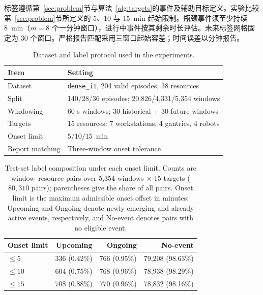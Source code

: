 \documentclass[a4paper,fleqn]{cas-dc}
\newcommand{\zhpara}[1]{%
  \par\begingroup\small\color{black!72}\noindent #1\par\endgroup}
\begin{document}
\zhpara{标签遵循第~\ref{sec:problem}节与算法~\ref{alg:targets}的事件及辅助目标定义。实验比较第~\ref{sec:problem}节所定义的 5、10 与 15~min 起始限制。瓶颈事件须至少持续 8~min（$m=8$ 个一分钟窗口），进行中事件按其剩余时长评估。未来标签网格固定为 30 个窗口。严格报告匹配采用三窗口起始容差；时间误差以分钟报告。}


\begin{table}[pos=!htbp]
\centering
\caption{Dataset and label protocol used in the experiments.}
\label{tab:exp-dataset}
\scriptsize
\setlength{\tabcolsep}{4pt}
\renewcommand{\arraystretch}{1.08}
\begin{tabularx}{\columnwidth}{@{}lX@{}}
\toprule
Item & Setting \\
\midrule
Dataset & \texttt{dense\_i1}, 204 valid episodes, 38 resources \\
Split & 140/28/36 episodes; 20,826/4,331/5,354 windows \\
Windowing & 60-s windows; 30 historical + 30 future windows \\
Targets & 15 resources: 7 workstations, 4 gantries, 4 robots \\
Onset limit & $5/10/15$~min \\
Report matching & Three-window onset tolerance \\
\bottomrule
\end{tabularx}
\end{table}

\begin{table}[pos=!htbp]
\centering
\caption{Test-set label composition under each onset limit. Counts are window--resource pairs over 5,354 windows $\times$ 15 targets ($80{,}310$ pairs); parentheses give the share of all pairs. Onset limit is the maximum admissible onset offset in minutes; Upcoming and Ongoing denote newly emerging and already active events, respectively, and No-event denotes pairs with no eligible event.}
\label{tab:dataset-labels}
\scriptsize
\setlength{\tabcolsep}{3.2pt}
\renewcommand{\arraystretch}{1.08}
\begin{tabular*}{\columnwidth}{@{\extracolsep{\fill}}lrrr@{}}
\toprule
Onset limit & Upcoming & Ongoing & No-event \\
\midrule
$\leq5$ & 336 (0.42\%) & 766 (0.95\%) & 79,208 (98.63\%) \\
$\leq10$ & 604 (0.75\%) & 768 (0.96\%) & 78,938 (98.29\%) \\
$\leq15$ & 708 (0.88\%) & 770 (0.96\%) & 78,832 (98.16\%) \\
\bottomrule
\end{tabular*}
\end{table}
\end{document}
